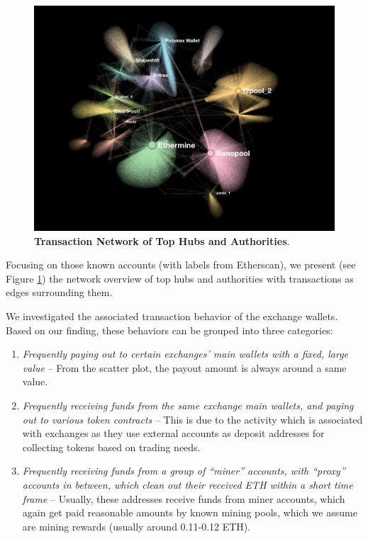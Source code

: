 \begin{figure}[t]
\centering
\includegraphics[width=1.0\textwidth]{images/7_implemenation_and_usecases/pagerank.jpeg}
\caption{\textbf{Transaction Network of Top Hubs and Authorities}.}
\label{fig:page-rank}
\end{figure}

Focusing on those known accounts (with labels from Etherscan), we present (see Figure \ref{fig:page-rank}) the network overview of top hubs and authorities with transactions as edges surrounding them.

We investigated the associated transaction behavior of the exchange wallets.
Based on our finding, these behaviors can be grouped into three categories:
\begin{enumerate}
    \item \textit{Frequently paying out to certain exchanges' main wallets with a fixed, large value} -- From the scatter plot, the payout amount is always around a same value.
    \item \textit{Frequently receiving funds from the same exchange main wallets, and paying out to various token contracts} -- This is due to the activity which is associated with exchanges as they use external accounts as deposit addresses for collecting tokens based on trading needs.

    \item \textit{Frequently receiving funds from a group of ``miner'' accounts, with ``proxy'' accounts in between, which clean out their received \gls{ETH} within a short time frame} -- Usually, these addresses receive funds from miner accounts, which again get paid reasonable amounts by known mining pools, which we assume are mining rewards (usually around 0.11-0.12 \gls{ETH}).
\end{enumerate}


